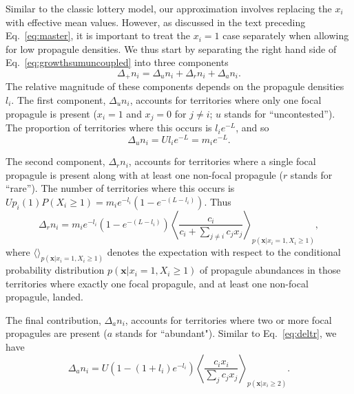 \documentclass[12pt]{article}
\begin{document}
Similar to the classic lottery model, our approximation involves replacing the $x_i$ with effective mean values. However, as discussed in the text preceding Eq.~\eqref{eq:master}, it is important to treat the $x_i=1$ case separately when allowing for low propagule densities. We thus start by separating the right hand side of Eq.~\eqref{eq:growthsumuncoupled} into three components
\begin{equation}
\Delta_+ n_i = \Delta_u n_i+\Delta_r n_i+\Delta_a n_i.\label{eq:delt_decomp}
\end{equation}
The relative magnitude of these components depends on the propagule densities $l_i$. The first component, $\Delta_u n_i$, accounts for territories where only one focal propagule is present ($x_i=1$ and $x_j=0$ for $j\neq i$; $u$ stands for ``uncontested''). The proportion of territories where this occurs is $l_i e^{-L}$, and so 
\begin{equation}
\Delta_u n_i=Ul_i e^{-L}=m_i e^{-L}.
\end{equation}

The second component, $\Delta_r n_i$, accounts for territories where a single focal propagule is present along with at least one non-focal propagule ($r$ stands for ``rare''). The number of territories where this occurs is $Up_i(1)P(X_i\geq 1)=m_i e^{-l_i}(1-e^{-(L-l_i)})$. Thus 
\begin{equation}
\Delta_r n_i = m_i e^{-l_i}(1-e^{-(L-l_i)})\left\langle  \frac{c_i}{c_i +\sum_{j\neq i} c_j x_j } \right\rangle_{p({\mathbf x}|x_i=1,X_i\geq 1)},  \label{eq:deltr}
\end{equation}
where $\langle \rangle_{p({\mathbf x}|x_i=1,X_i\geq 1)}$ denotes the expectation with respect to the conditional probability distribution $p({\mathbf x}|x_i=1,X_i\geq 1)$ of propagule abundances in those territories where exactly one focal propagule, and at least one non-focal propagule, landed. 

The final contribution, $\Delta_a n_i$, accounts for territories where two or more focal propagules are present ($a$ stands for ``abundant"). Similar to Eq.~\eqref{eq:deltr}, we have 
\begin{equation}
\Delta_a n_i=U(1-(1+l_i)e^{-l_i})\left\langle \frac{c_i x_i}{\sum_j c_j x_j} \right\rangle_{p({\mathbf x}|x_i\geq 2)}.\label{eq:delta}
\end{equation} 
\end{document}
